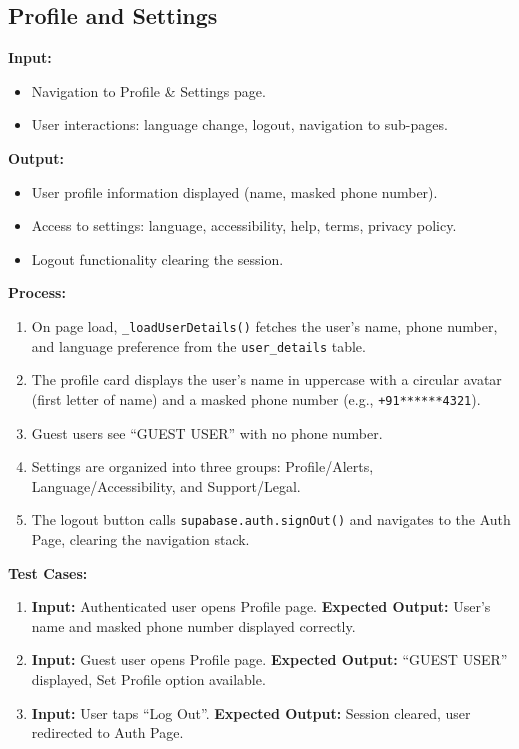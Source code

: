 \subsection{Profile and Settings}

\textbf{Input:}
\begin{itemize}
    \item Navigation to Profile \& Settings page.
    \item User interactions: language change, logout, navigation to sub-pages.
\end{itemize}

\textbf{Output:}
\begin{itemize}
    \item User profile information displayed (name, masked phone number).
    \item Access to settings: language, accessibility, help, terms, privacy policy.
    \item Logout functionality clearing the session.
\end{itemize}

\textbf{Process:}
\begin{enumerate}
    \item On page load, \texttt{\_loadUserDetails()} fetches the user's name, phone number, and language preference from the \texttt{user\_details} table.
    \item The profile card displays the user's name in uppercase with a circular avatar (first letter of name) and a masked phone number (e.g., \texttt{+91******4321}).
    \item Guest users see ``GUEST USER'' with no phone number.
    \item Settings are organized into three groups: Profile/Alerts, Language/Accessibility, and Support/Legal.
    \item The logout button calls \texttt{supabase.auth.signOut()} and navigates to the Auth Page, clearing the navigation stack.
\end{enumerate}

\textbf{Test Cases:}
\begin{enumerate}
    \item \textbf{Input:} Authenticated user opens Profile page. \textbf{Expected Output:} User's name and masked phone number displayed correctly.

    \item \textbf{Input:} Guest user opens Profile page. \textbf{Expected Output:} ``GUEST USER'' displayed, Set Profile option available.

    \item \textbf{Input:} User taps ``Log Out''. \textbf{Expected Output:} Session cleared, user redirected to Auth Page.
\end{enumerate}

